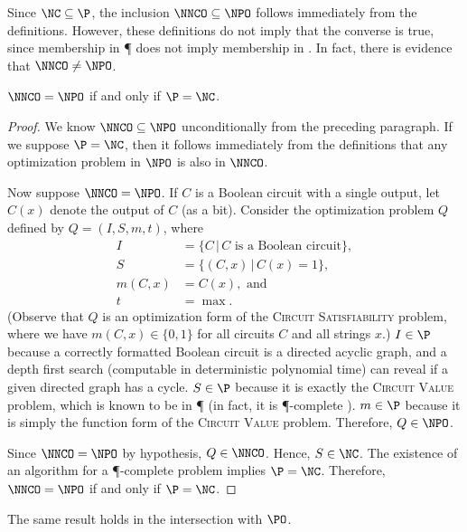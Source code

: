 \documentclass[]{article}
\begin{document}
Since $\NC \subseteq \P$, the inclusion $\NNCO \subseteq \NPO$ follows immediately from the definitions.
However, these definitions do not imply that the converse is true, since membership in \P{} does not imply membership in \NC.
In fact, there is evidence that $\NNCO \neq \NPO$.
\begin{proposition}\label{prop:nnconpo}
  $\NNCO = \NPO$ if and only if $\P = \NC$.
\end{proposition}
\begin{proof}
  We know $\NNCO \subseteq \NPO$ unconditionally from the preceding paragraph.
  If we suppose $\P = \NC$, then it follows immediately from the definitions that any optimization problem in $\NPO$ is also in $\NNCO$.

  Now suppose $\NNCO = \NPO$.
  If $C$ is a Boolean circuit with a single output, let $C(x)$ denote the output of $C$ (as a bit).
  Consider the optimization problem $Q$ defined by $Q = (I, S, m, t)$, where
  \begin{align*}
    I & = \{ C \, | \, C \text{ is a Boolean circuit} \}, \\
    S & = \{ (C, x) \, | \, C(x) = 1 \}, \\
    m(C, x) & = C(x), \text{ and} \\
    t & = \max.
  \end{align*}
  (Observe that $Q$ is an optimization form of the \textsc{Circuit Satisfiability} problem, where we have $m(C, x) \in \{0, 1\}$ for all circuits $C$ and all strings $x$.)
  $I \in \P$ because a correctly formatted Boolean circuit is a directed acyclic graph, and a depth first search (computable in deterministic polynomial time) can reveal if a given directed graph has a cycle.
  $S \in \P$ because it is exactly the \textsc{Circuit Value} problem, which is known to be in \P{} (in fact, it is \P-complete \cite[Problem~A.1.1]{ghr95}).
  $m \in \P$ because it is simply the function form of the \textsc{Circuit Value} problem.
  Therefore, $Q \in \NPO$.

  Since $\NNCO = \NPO$ by hypothesis, $Q \in \NNCO$.
  Hence, $S \in \NC$.
  The existence of an \NC{} algorithm for a \P-complete problem implies $\P = \NC$.
  Therefore, $\NNCO = \NPO$ if and only if $\P = \NC$.
\end{proof}

The same result holds in the intersection with $\PO$.
\end{document}
